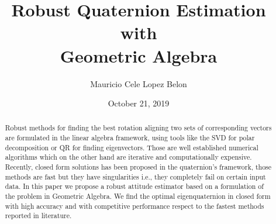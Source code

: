\documentclass{birkjour}
\numberwithin{equation}{section}
\begin{document}
%
%
%
%
%
%
%
%
%


\title[Robust Quaternion Estimation with Geometric Algebra]
 {Robust Quaternion Estimation with \\Geometric Algebra}

\author[Mauricio Cele Lopez Belon]{Mauricio Cele Lopez Belon}
\address{Madrid, Spain}



\date{October 21, 2019}

\begin{abstract}

Robust methods for finding the best rotation aligning two sets of corresponding vectors are formulated in the linear algebra framework, using tools like the SVD for polar decomposition or QR for finding eigenvectors. Those are well established numerical algorithms which on the other hand are iterative and computationally expensive. Recently, closed form solutions has been proposed in the quaternion's framework, those methods are fast but they have singularities i.e., they completely fail on certain input data. In this paper we propose a robust attitude estimator based on a formulation of the problem in Geometric Algebra. We find the optimal eigenquaternion in closed form with high accuracy and with competitive performance respect to the fastest methods reported in literature.

\end{abstract}

\maketitle
\end{document}
